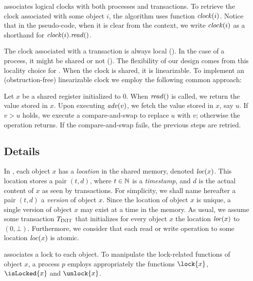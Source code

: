  associates logical clocks with both processes and
transactions.  To retrieve the clock associated with some object $i$,
the algorithm uses function $\clockOf{i}$.  Notice that in the
pseudo-code, when it is clear from the context, we write $\clockOf{i}$
as a shorthand for $\clockOf{i}.\mathit{read}()$.

The clock associated with a transaction is always local ().
In the case of a process, it might be shared or not ().
The flexibility of our design comes from this locality choice for .
When the clock is shared, it is linearizable.
To implement an (obstruction-free) linearizable clock we employ the following common approach:
\begin{construction}
  Let $x$ be a shared register initialized to $0$.
  When $\cread$ is called, we return the value stored in $x$.
  Upon executing $\cadv(v)$, we fetch the value stored in $x$, say $u$.
  If $v > u$ holds, we execute a compare-and-swap to replace $u$ with $v$; 
  otherwise the operation returns.
  If the compare-and-swap fails, the previous steps are retried.
\end{construction}



\subsection{Details}

In , each object $x$ has a \emph{location} in the shared memory, denoted $\locationOf{x}$.
This location stores a pair $(t,d)$, where $t \in \naturalSet$ is a \emph{timestamp}, and $d$ is the actual content of $x$ as seen by transactions.
For simplicity, we shall name hereafter a pair $(t,d)$ a \emph{version} of object $x$.
Since the location of object $x$ is unique, a single version of object $x$ may exist at a time in the memory.
As usual, we assume some transaction $\transInit$ that initializes for every object $x$ the location $\locationOf{x}$ to $(0,\bot)$.
Furthermore, we consider that each read or write operation to some location $\locationOf{x}$ is atomic.

 associates a lock to each object.
To manipulate the lock-related functions of object $x$, 
a process $p$ employs appropriately the functions $\lock{x}$, $\isLocked{x}$ and $\unlock{x}$.

